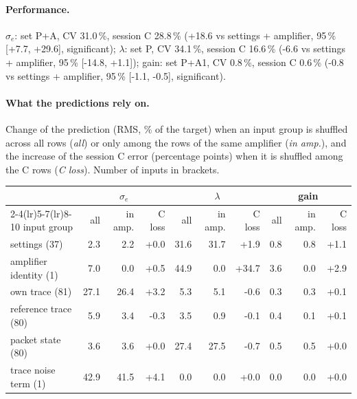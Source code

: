 \paragraph{Performance.}
$\sigma_e$: set P+A, CV 31.0\,\%, session C 28.8\,\% (+18.6 vs settings + amplifier, 95\,\% [+7.7, +29.6], significant); $\lambda$: set P, CV 34.1\,\%, session C 16.6\,\% (-6.6 vs settings + amplifier, 95\,\% [-14.8, +1.1]); gain: set P+A1, CV 0.8\,\%, session C 0.6\,\% (-0.8 vs settings + amplifier, 95\,\% [-1.1, -0.5], significant).
\paragraph{What the predictions rely on.} Change of the prediction (RMS, \% of the target) when an input group is shuffled across all rows (\emph{all}) or only among the rows of the same amplifier (\emph{in amp.}), and the increase of the session C error (percentage points) when it is shuffled among the C rows (\emph{C loss}). Number of inputs in brackets.
\begin{center}\footnotesize
\begin{tabular}{lrrrrrrrrr}
\toprule
 & \multicolumn{3}{c}{$\sigma_e$} & \multicolumn{3}{c}{$\lambda$} & \multicolumn{3}{c}{gain} \\
\cmidrule(lr){2-4}\cmidrule(lr){5-7}\cmidrule(lr){8-10}
input group & all & in amp. & C loss & all & in amp. & C loss & all & in amp. & C loss \\
\midrule
settings (37) & 2.3 & 2.2 & +0.0 & 31.6 & 31.7 & +1.9 & 0.8 & 0.8 & +1.1 \\
amplifier identity (1) & 7.0 & 0.0 & +0.5 & 44.9 & 0.0 & +34.7 & 3.6 & 0.0 & +2.9 \\
own trace (81) & 27.1 & 26.4 & +3.2 & 5.3 & 5.1 & -0.6 & 0.3 & 0.3 & +0.1 \\
reference trace (80) & 5.9 & 3.4 & -0.3 & 3.5 & 0.9 & -0.1 & 0.4 & 0.1 & +0.1 \\
packet state (80) & 3.6 & 3.6 & +0.0 & 27.4 & 27.5 & -0.7 & 0.5 & 0.5 & +0.0 \\
trace noise term (1) & 42.9 & 41.5 & +4.1 & 0.0 & 0.0 & +0.0 & 0.0 & 0.0 & +0.0 \\
\bottomrule
\end{tabular}
\end{center}
